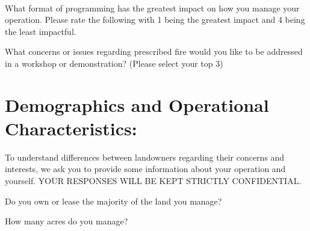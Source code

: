 \documentclass[
  english,
  ]{sdapsclassic}
\begin{document}
\begin{questionnaire}
     {}~{}
    
    \begin{choicequestion}[cols=4]{What format of programming has the greatest impact on how you manage your operation. Please rate the following with 1 being the greatest impact and 4 being the least impactful.}
    \end{choicequestion}
    
    \begin{choicequestion}[cols=6]{What concerns or issues regarding prescribed fire would you like to be addressed in a workshop or demonstration? (Please select your top 3)}
    \end{choicequestion}  
  
    \section{Demographics and Operational Characteristics:}
    
  To understand differences between landowners regarding their concerns and interests, we ask you to provide some information about your operation and yourself. YOUR RESPONSES WILL BE KEPT STRICTLY CONFIDENTIAL.
    

    \begin{choicequestion}[cols=2]{Do you own or lease the majority of the land you manage?}
    \end{choicequestion}

    \begin{choicequestion}{How many acres do you manage?}
    \end{choicequestion}      
    

\end{questionnaire}
\end{document}
